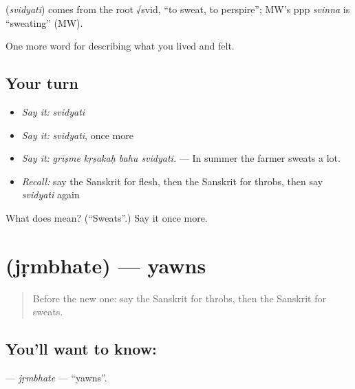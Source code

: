 \begin{cousinweb}
\textbf{} (\emph{svidyati}) comes from the root √svid, \textquotedblleft{}to sweat, to perspire\textquotedblright{}; MW's ppp \emph{svinna} is \textquotedblleft{}sweating\textquotedblright{} (MW).
\end{cousinweb}

\begin{grammarlens}[title={What you've built}]
One more word for describing what you lived and felt.
\end{grammarlens}

\subsection*{Your turn}
\begin{itemize}
\raggedright
  \item \emph{Say it:} \emph{svidyati}
  \item \emph{Say it:} \emph{svidyati}, once more
  \item \emph{Say it:} \emph{grīṣme kṛṣakaḥ bahu svidyati.} — In summer the farmer sweats a lot.
  \item \emph{Recall:} say the Sanskrit for flesh, then the Sanskrit for throbs, then say \emph{svidyati} again
\end{itemize}

\begin{tcolorbox}[breakable,colback=teal!4,colframe=teal!35!black,title={Before you move on}]
What does  mean? (\textquotedblleft{}Sweats\textquotedblright{}.) Say it once more.
\end{tcolorbox}
\section[\texorpdfstring{\sk{जृम्भते} (jṛmbhate)}{जृम्भते (jṛmbhate)}]{ (jṛmbhate) — yawns}

\label{lesson:SA-C475-jrmbhate}



\begin{quote}
Before the new one: say the Sanskrit for throbs, then the Sanskrit for sweats.
\end{quote}

\subsection*{You'll want to know: }
\textbf{} — \emph{jṛmbhate} — \textquotedblleft{}yawns\textquotedblright{}.

